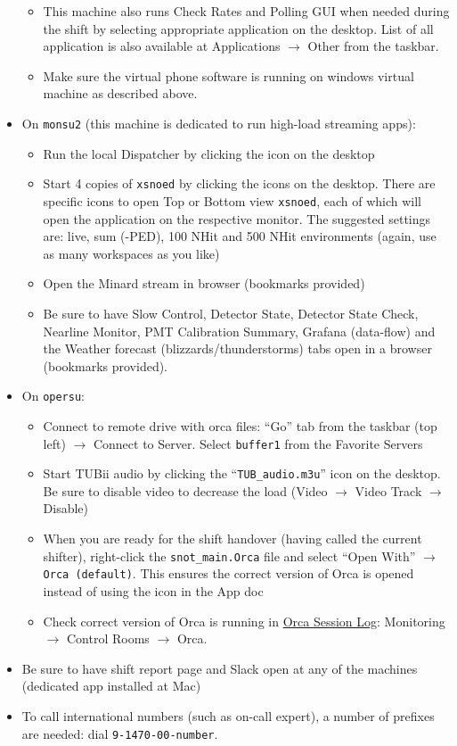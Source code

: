 \documentclass[12pt, a4paper]{article}
\begin{document}
\begin{itemize}
\begin{itemize}
			\item This machine also runs Check Rates and Polling GUI when needed during the shift by selecting appropriate application on the desktop. List of all application is also available at Applications $\rightarrow$ Other from the taskbar.
		\item Make sure the virtual phone software is running on windows virtual machine as described above.
	\end{itemize}
	\item On {\tt monsu2} (this machine is dedicated to run high-load streaming apps):
	\begin{itemize}
		\item Run the local Dispatcher by clicking the icon on the desktop
		\item Start 4 copies of {\tt xsnoed} by clicking the icons on the desktop. There are specific icons to open Top or Bottom view {\tt xsnoed}, each of which will open the application on the respective monitor. The suggested settings are: live, sum (-PED), 100 NHit and 500 NHit environments (again, use as many workspaces as you like)
		\item Open the Minard stream in browser (bookmarks provided)
		\item Be sure to have Slow Control, Detector State, Detector State Check, Nearline Monitor, PMT Calibration Summary, Grafana (data-flow) and the Weather forecast (blizzards/thunderstorms) tabs open in a browser (bookmarks provided).
	\end{itemize}
	\item On {\tt opersu}:
	\begin{itemize}
		\item Connect to remote drive with orca files: ``Go'' tab from the taskbar (top left) $\rightarrow$ Connect to Server. Select {\tt buffer1} from the Favorite Servers
		\item Start TUBii audio by clicking the ``{\tt TUB\_audio.m3u}'' icon on the desktop. Be sure to disable video to decrease the load (Video $\rightarrow$ Video Track $\rightarrow$ Disable)
		\item When you are ready for the shift handover (having called the current shifter), right-click the {\tt snot\_main.Orca} file and select ``Open With'' $\rightarrow$ {\tt Orca (default)}. This ensures the correct version of Orca is opened instead of using the icon in the App doc
		\item Check correct version of Orca is running in \href{https://snopl.us/monitoring/orca-session-logs}{Orca Session Log}: Monitoring $\rightarrow$ Control Rooms $\rightarrow$ Orca.
	\end{itemize}
\item Be sure to have shift report page and Slack open at any of the machines (dedicated app installed at Mac)
\item To call international numbers (such as on-call expert), a number of prefixes are needed: dial {\tt 9-1470-00-number}.
\end{itemize}
\end{document}
